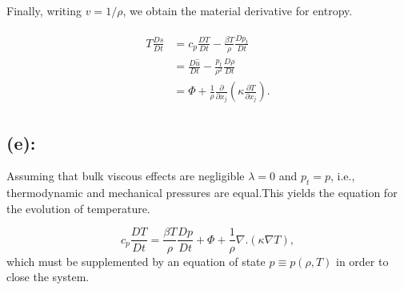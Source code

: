 \documentclass{article}
\begin{document}
Finally, writing $v = 1/\rho$, we obtain the material derivative for entropy.

\begin{align}\label{eq:entropy}
 \begin{split}
  T \frac{Ds}{Dt} &= c_{p} \frac{DT}{Dt} - \frac{\beta T}{\rho}\frac{Dp_{t}}{Dt}\\
  & = \frac{D\hat{u}}{Dt} - \frac{p_{t}}{\rho^{2}}\frac{D\rho}{Dt}\\
  & = \Phi + \frac{1}{\rho} \frac{\partial }{\partial x_{j}}\left(\kappa \frac{\partial T}{\partial x_{j}} \right).
 \end{split}
\end{align}
\subsection*{(e):}
Assuming that bulk viscous effects are negligible $\lambda = 0 $ and $p_{t} = p$, i.e., thermodynamic and mechanical pressures are equal.This yields the equation for the evolution of temperature. 

\begin{equation}\label{eq:temperature}
 c_{p}\frac{DT}{Dt} = \frac{\beta T}{\rho}\frac{Dp}{Dt} + \Phi + \frac{1}{\rho}\nabla.(\kappa \nabla T),
\end{equation}
which must be supplemented by an equation of state $p \equiv p(\rho, T)$ in order to close the system. 

\end{document}
